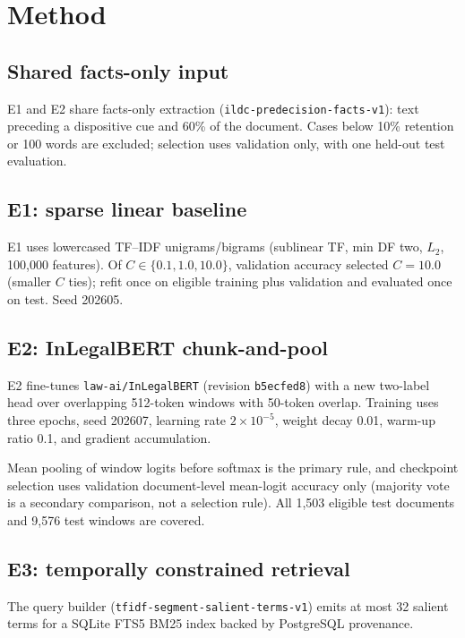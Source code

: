 \documentclass[conference]{IEEEtran}
\begin{document}
\section{Method}

\subsection{Shared facts-only input}

E1 and E2 share facts-only extraction (\texttt{ildc-predecision-facts-v1}): text preceding a dispositive cue
and 60\% of the document. Cases below 10\% retention or 100 words are excluded;
selection uses
validation only, with one held-out test evaluation.

\subsection{E1: sparse linear baseline}

E1 uses lowercased TF--IDF unigrams/bigrams (sublinear TF, min DF two, $L_2$,
100{,}000 features). Of
$C \in \{0.1, 1.0, 10.0\}$, validation accuracy selected $C = 10.0$ (smaller $C$
ties); refit once on eligible
training plus validation and evaluated once on test. Seed 202605.

\subsection{E2: InLegalBERT chunk-and-pool}

E2 fine-tunes \texttt{law-ai/InLegalBERT} (revision
\texttt{b5ecfed8}) with a new two-label head over overlapping 512-token windows with 50-token overlap.
Training uses three epochs, seed 202607, learning rate $2\times10^{-5}$, weight
decay 0.01, warm-up ratio 0.1, and gradient
accumulation.

Mean pooling of window logits before softmax is the primary rule, and checkpoint
selection uses validation document-level mean-logit accuracy only (majority vote
is a secondary comparison, not a selection rule). All
1{,}503 eligible test documents and 9{,}576 test windows are covered.

\subsection{E3: temporally constrained retrieval}
\label{sec:e3}

The query builder (\texttt{tfidf-\allowbreak segment-\allowbreak salient-\allowbreak terms-\allowbreak v1}) emits at most 32 salient
terms for a SQLite FTS5 BM25 index backed by PostgreSQL provenance.
\end{document}
